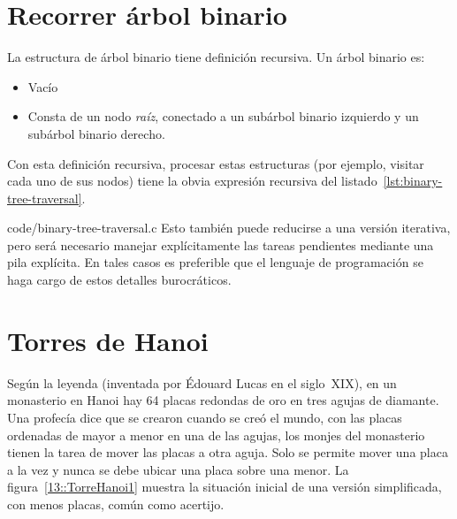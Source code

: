 \section{Recorrer árbol binario}
\label{sec:binary-tree-traversal}

  La estructura de árbol binario tiene definición recursiva.
  Un árbol binario es:
  \begin{itemize}
  \item
    Vacío
  \item
    Consta de un nodo \emph{raíz},
    conectado a un subárbol binario izquierdo
    y un subárbol binario derecho.
  \end{itemize}
  Con esta definición recursiva,
  procesar estas estructuras
  (por ejemplo,
   visitar cada uno de sus nodos)
  tiene la obvia expresión recursiva
  del listado~\ref{lst:binary-tree-traversal}.
  
                  {code/binary-tree-traversal.c}
  Esto también puede reducirse a una versión iterativa,
  pero será necesario manejar explícitamente las tareas pendientes
  mediante una pila explícita.
  En tales casos es preferible que el lenguaje de programación
  se haga cargo de estos detalles burocráticos.

\section{Torres de Hanoi}

  Según la leyenda
  (inventada por Édouard Lucas en el siglo~XIX),
  en un monasterio en Hanoi
  hay \num{64} placas redondas de oro
  en tres agujas de diamante.
  Una profecía dice que se crearon cuando se creó el mundo,
  con las placas ordenadas de mayor a menor en una de las agujas,
  los monjes del monasterio tienen la tarea de mover las placas a otra aguja.
  Solo se permite mover una placa a la vez
  y nunca se debe ubicar una placa sobre una menor.
  La figura~\ref{13::TorreHanoi1}
  muestra la situación inicial de una versión simplificada,
  con menos placas,
  común como acertijo.

